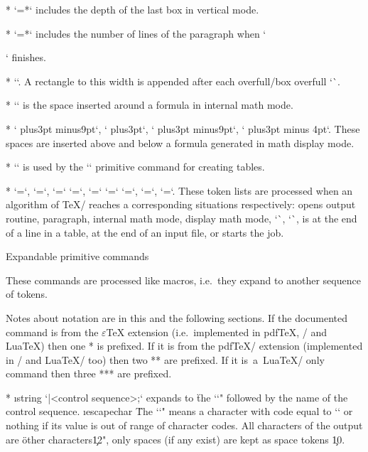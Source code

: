 {* \y`\prevdepth=*` includes the depth of the last box in vertical mode.

* \y`\prevgraph=*` includes the number of lines of the paragraph when `\par`
  finishes.

* \y`\overfullrule=5pt`. A rectangle to this width is appended after each
  \ii overfull/box overfull `\hbox`.

* \y`\mathsurround=0pt` is the space inserted around a formula in internal math mode.

* \y`\abovedisplayskip=12pt plus3pt minus9pt`,
  \y`\abovedisplayshortskip=0pt plus3pt`,
  \y`\belowdisplayskip=12pt plus3pt minus9pt`,
  \y`\belowdisplayshortskip=7pt plus3pt minus 4pt`.
  These spaces are inserted above and below a formula generated in math display
  mode.

* \y`\tabskip=0pt` is used by the `\halign` primitive command for creating tables.

* \y`\output={\plainoutput}`, \y`\everypar={}`, \y`\everymath={}`
  \y`\everydisplay={}`, 
  \y`\everyhbox={}`
  \y`\everyvbox={}`
  \y`\everycr={}`,
  \*\y`\everyeof={}`,
  \y`\everyjob={}`.
  These token lists are processed when an algorithm of \TeX/ reaches a corresponding
  situations respectively: opens output routine, paragraph, internal math mode, display
  math mode, {\noda\x`\vbox`, \x`\hbox`}, is at the end of a line in a table,
  at the end of an input file, or starts the job.
\enditems

\sec[expand] Expandable primitive commands

These commands are processed like macros, i.e.\ they expand to
another sequence of tokens. 

Notes about notation are in this and the following sections. 
If the documented command is from the $\varepsilon$\TeX{} extension 
(i.e.\ implemented in pdf\TeX, \XeTeX/
and Lua\TeX) then one * is prefixed. If it is from the pdf\TeX/ extension
(implemented in \XeTeX/ and Lua\TeX/ too) then two ** are prefixed. 
If it is~a~Lua\TeX/ only command then three *** are prefixed.

\begitems
* \i string `\string|<control sequence>;` expands to \"the \x`\escapechar`"
  followed by the name of the control sequence. \i escapechar \"The \x`\escapechar`" means a
  character with code equal to \x`\escapechar` or nothing if its value is
  out of range of character codes.
  All characters of the output are \"other characters\c{12}", only spaces (if any exist)
  are kept as space tokens {}\c{10}. 

}

